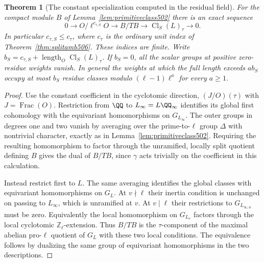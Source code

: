 \documentclass[a4paper,11pt]{article}
\newtheorem{theorem}[proposition]{Theorem}
\theoremstyle{definition}
\theoremstyle{remark}
\newcommand{\ZZ}{\mathbb Z}\newcommand{\ord}{\operatorname{ord}}
\numberwithin{equation}{section}
\newcommand{\Cl}{\operatorname{Cl}}
\begin{document}
\begin{theorem}[The constant specialization computed in the residual field]\leavevmode
\label{thm:sunitbase507}
For the compact module \(B\) of Lemma~\ref{lem:primitiveclass502}
there is an exact sequence
\[
 0\longrightarrow O/\ell^{c_{\tau,S}}O
   \longrightarrow B/TB
   \longrightarrow \Cl_S(L)_\tau\longrightarrow0.
\]
In particular \(c_{\tau,S}\le c_\tau\), where \(c_\tau\) is
the ordinary unit index of Theorem~\ref{thm:splitamb506}.
These indices are finite. Write
\(b_S=c_{\tau,S}+\operatorname{length}_O\Cl_S(L)_\tau\).
If \(b_S=0\), all the scalar groups at positive zero-residue
weights vanish. In general the weights at which the full
length exceeds \(a b_S\) occupy at most \(b_S\) residue classes
modulo \((\ell-1)\ell^a\) for every \(a\ge1\).
\end{theorem}
\begin{proof}
Use the constant coefficient in the cyclotomic direction,
\((J/O)(\tau)\) with \(J=\operatorname{Frac}(O)\). Restriction
from \(\QQ\) to \(L_\infty=L\QQ_\infty\) identifies its global
first cohomology with the equivariant homomorphisms on
\(G_{L_\infty}\). The outer groups in degrees one and two vanish
by averaging over the prime-to-\(\ell\) group \(\Delta\) with
nontrivial character, exactly as in
Lemma~\ref{lem:primitiveclass502}. Requiring the resulting
homomorphism to factor through the unramified, locally split
quotient defining \(B\) gives the dual of \(B/TB\), since
\(\gamma\) acts trivially on the coefficient in this calculation.

Instead restrict first to \(L\). The same averaging identifies
the global classes with equivariant homomorphisms on \(G_L\).
At \(v\nmid\ell\) their inertia condition is unchanged on
passing to \(L_\infty\), which is unramified at \(v\).
At \(v\mid\ell\) their restrictions to \(G_{L_{\infty,w}}\)
must be zero. Equivalently the local homomorphism on \(G_{L_v}\)
factors through the local cyclotomic \(\ZZ_\ell\)-extension.
Thus \(B/TB\) is the \(\tau\)-component of the maximal abelian
pro-\(\ell\) quotient of \(G_L\) with these two local conditions.
The equivalence follows by dualizing the same group of
equivariant homomorphisms in the two descriptions.


\end{proof}
\end{document}
